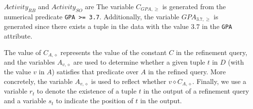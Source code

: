 \begin{example}
$Activity_{RB}$ and $Activity_{SO}$ are  
The variable $C_{GPA, \geq}$ is generated from the numerical predicate {\tt GPA >= 3.7}. Additionally, the variable $GPA_{3.7, \geq}$ is generated since there exists a tuple in the data with the value $3.7$ in the {\tt GPA} attribute. 
\end{example} 

The value of $C_{A, \diamond}$ represents the value of the constant $C$ in the refinement query, and the variables $A_{v, \diamond}$ are used to determine whether a given tuple $t$ in $D$ (with the value $v$ in $A$) satisfies that predicate over $A$ in the refined query. More concretely, the variable $A_{v, \diamond}$ is used to reflect whether  $v \diamond C_{A, \diamond}$. Finally, we use a variable $r_t$ to denote the existence of a tuple $t$ in the output of a refinement query and a variable $s_t$ to indicate the position of $t$ in the output.



